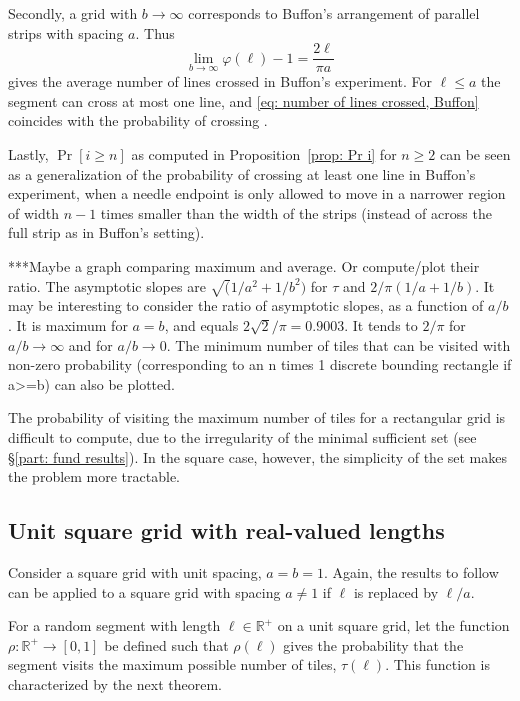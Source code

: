 \documentclass[12pt, a4paper]{article}
\newcommand{\funt}{\tau} %
\newcommand{\funta}{\varphi} %
\newcommand{\probmax}{\rho} %
\newcommand{\len}{\ell} %
\begin{document}
Secondly, a grid with $b \rightarrow \infty$ corresponds to Buffon's arrangement of parallel strips with spacing $a$. Thus
\begin{equation}
\label{eq: number of lines crossed, Buffon}
\lim_{b \rightarrow \infty} \funta(\len)-1 = \frac{2\len}{\pi a}
\end{equation}
gives the average number of lines crossed in Buffon's experiment. For $\len \leq a$ the segment can cross at most one line, and \eqref{eq: number of lines crossed, Buffon} coincides with the probability of crossing \cite[section 1.1]{Mathai99}.

Lastly, $\Pr[i \geq n]$ as computed in Proposition~\ref{prop: Pr i} for $n \geq 2$ can be seen as a generalization of the probability of crossing at least one line in Buffon's experiment, when a needle endpoint is only allowed to move in a narrower region of width $n-1$ times smaller than the width of the strips (instead of across the full strip as in Buffon's setting).

***Maybe a graph comparing maximum and average. Or compute/plot their ratio. The asymptotic slopes are $\sqrt(1/a^2+1/b^2)$ for $\funt$ and $2/\pi(1/a+1/b)$. It may be interesting to consider the ratio of asymptotic slopes, as a function of $a/b$. It is maximum for $a=b$, and equals $2\sqrt 2/\pi = 0.9003$. It tends to $2/\pi$ for $a/b \rightarrow \infty$ and for $a/b \rightarrow 0$. The minimum number of tiles that can be visited with non-zero probability (corresponding to an n times 1 discrete bounding rectangle if a>=b) can also be plotted.

The probability of visiting the maximum number of tiles for a rectangular grid is difficult to compute, due to the irregularity of the minimal sufficient set (see \S\ref{part: fund results}). In the square case, however, the simplicity of the set makes the problem more tractable. 


\subsection{Unit square grid with real-valued lengths}
\label{part: probmax: unit square grid, real lengths}

Consider a square grid with unit spacing, $a=b=1$. Again, the results to follow can be applied to a square grid with spacing $a \neq 1$ if $\len$ is replaced by $\len/a$.

For a random segment with length $\len \in \mathbb R^+$ on a unit square grid, let the function $\probmax: \mathbb R^+ \to [0,1]$ be defined such that $\probmax(\len)$ gives the probability that the segment visits the maximum possible number of tiles, $\funt(\len)$. This function is characterized by the next theorem.
\end{document}
